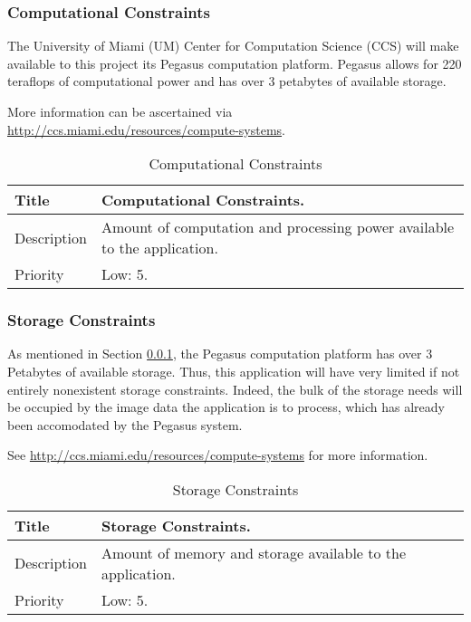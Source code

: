\subsubsection{Computational Constraints}
  \label{system-constraints/hardware/computation-title}
  The University of Miami (UM) Center for Computation Science (CCS) will
  make available to this project its Pegasus computation platform. Pegasus
  allows for 220 teraflops of computational power and has over 3 petabytes of
  available storage.

  More information can be ascertained via
  \url{http://ccs.miami.edu/resources/compute-systems}.

  \begin{table}[h!]
    \caption{Computational Constraints}
    \label{system-constraints/hardware/computation-table}
    \begin{tabularx}{\textwidth}{|l|X|}
      \hline
      Title       & Computational Constraints. \\ \hline
      Description & Amount of computation and processing power available to
                    the application. \\ \hline
      Priority    & Low: 5. \\ \hline
    \end{tabularx}
  \end{table}

\subsubsection{Storage Constraints}
  As mentioned in Section \ref{system-constraints/hardware/computation-title},
  the Pegasus computation platform has over 3 Petabytes of available storage.
  Thus, this application will have very limited if not entirely nonexistent
  storage constraints. Indeed, the bulk of the storage needs will be occupied by
  the image data the application is to process, which has already been
  accomodated by the Pegasus system.

  See \url{http://ccs.miami.edu/resources/compute-systems} for more information.

  \begin{table}[h!]
    \caption{Storage Constraints}
    \label{system-constraints/hardware/storage-table}
    \begin{tabularx}{\textwidth}{|l|X|}
      \hline
      Title       & Storage Constraints. \\ \hline
      Description & Amount of memory and storage available to the application.
                    \\ \hline
      Priority    & Low: 5. \\ \hline
    \end{tabularx}
  \end{table}
